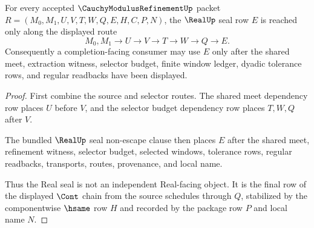\begin{theorem}
\label{thm:cauchy-modulus-refinement-real-seal-route}
For every accepted $\CauchyModulusRefinementUp$ packet $R=(M_0,M_1,U,V,T,W,Q,E,H,C,P,N)$, the $\RealUp$ seal row $E$ is reached only along the displayed route
$$
M_0,M_1 \longrightarrow U \longrightarrow V \longrightarrow T \longrightarrow W \longrightarrow Q \longrightarrow E.
$$
Consequently a completion-facing consumer may use $E$ only after the shared meet, extraction witness, selector budget, finite window ledger, dyadic tolerance rows, and regular readbacks have been displayed.
\end{theorem}
\begin{proof}
First combine the source and selector routes. The shared meet dependency row places $U$ before $V$, and the selector budget dependency row places $T,W,Q$ after $V$.

The bundled $\RealUp$ seal non-escape clause then places $E$ after the shared meet, refinement witness, selector budget, selected windows, tolerance rows, regular readbacks, transports, routes, provenance, and local name.

Thus the Real seal is not an independent Real-facing object. It is the final row of the displayed $\Cont$ chain from the source schedules through $Q$, stabilized by the componentwise $\hsame$ row $H$ and recorded by the package row $P$ and local name $N$.
\end{proof}

